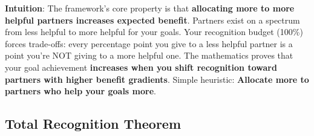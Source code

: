 \documentclass[11pt,a4paper]{article}
\theoremstyle{definition}
\theoremstyle{remark}
\begin{document}
\textbf{Intuition}: The framework's core property is that \textbf{allocating more to more helpful partners increases expected benefit}. Partners exist on a spectrum from less helpful to more helpful for your goals. Your recognition budget (100\%) forces trade-offs: every percentage point you give to a less helpful partner is a point you're NOT giving to a more helpful one. The mathematics proves that your goal achievement \textbf{increases when you shift recognition toward partners with higher benefit gradients}. Simple heuristic: \textbf{Allocate more to partners who help your goals more}.

\subsection{Total Recognition Theorem}
\end{document}
